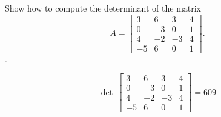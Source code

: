 
\begin{exerciseStatement}


Show how to compute the determinant of the matrix \[A= \left[\begin{array}{cccc}
3 & 6 & 3 & 4 \\
0 & -3 & 0 & 1 \\
4 & -2 & -3 & 4 \\
-5 & 6 & 0 & 1
\end{array}\right] .\].


\end{exerciseStatement}
    
\begin{exerciseAnswer} 
\[\operatorname{det}\  \left[\begin{array}{cccc}
3 & 6 & 3 & 4 \\
0 & -3 & 0 & 1 \\
4 & -2 & -3 & 4 \\
-5 & 6 & 0 & 1
\end{array}\right] = 609 \]
\end{exerciseAnswer}
    
